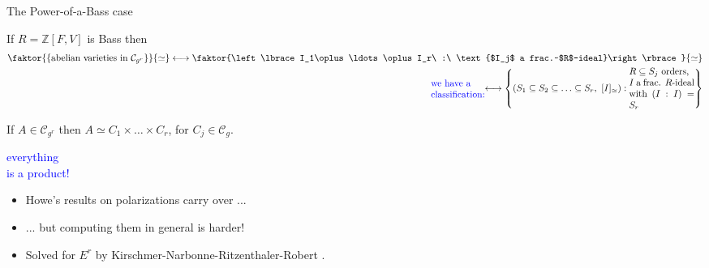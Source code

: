 \documentclass[usenames,dvipsnames]{beamer}
\def\Q{\mathbb{Q}}
\def\Z{\mathbb{Z}}
\def\F{\mathbb{F}}
\DeclareMathOperator{\Mat}{Mat}
\DeclareMathOperator{\Pic}{Pic}
\DeclareMathOperator{\End}{End}
\newcommand{\cC}{{\mathcal C}}
\newcommand{\cO}{{\mathcal O}}
\newcommand{\set}[1]{\left\lbrace#1\right\rbrace }
\newcommand{\blue}[1]{\textcolor{blue}{#1}}
\begin{document}
\begin{frame}{ The Power-of-a-Bass case }
	\begin{theorem} If $R=\Z[F,V]$ is Bass then 
	\begin{align*}
	\faktor{\set{\text{abelian varieties in }\cC_{g^r}}}{ \simeq } 
	\longleftrightarrow
	\faktor{\set{I_1\oplus\ldots\oplus I_r\ :\ \text{$I_j$ a frac.~$R$-ideal}}}{\simeq}&\\
	\blue{\parbox{5.5em}{we have a\\ classification:}}
	\longleftrightarrow
	\set{(S_1\subseteq S_2 \subseteq \ldots \subseteq S_r ,\ [I]_{\simeq}) :          
	\parbox{7em}{$R\subseteq S_j$ orders,\\ $I$ a frac. $R$-ideal with $(I:I)=S_r$}}&
    \end{align*}
    \end{theorem}
\pause    
    \begin{corollary}
	If $A\in \cC_{g^r}$ then $A \simeq C_1\times \ldots \times C_r$, for $C_j\in\cC_g$.     
\pause
    \blue{\parbox{8em}{everything\\ is a product!}}
    \end{corollary}
    \begin{itemize}
\pause  
    \item Howe's results on polarizations carry over ...  
    \item ... but computing them in general is harder!
\pause    
    \item Solved for $E^r$ by Kirschmer-Narbonne-Ritzenthaler-Robert \cite{KirNarbRitzDam21}.
	\end{itemize}
\end{frame}
%
\end{document}
